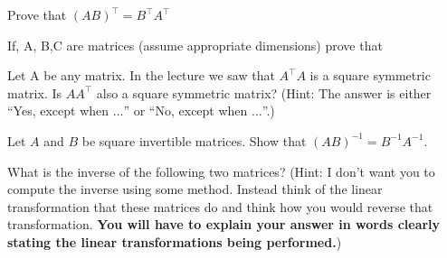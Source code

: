 \documentclass[solution,addpoints,12pt]{exam}
\begin{document}
\begin{questions}
\question[1] Prove that $(AB)^\top = B^\top A^\top$
\begin{solution}
\end{solution}

\question If, A, B,C are matrices (assume appropriate dimensions) prove that 

\question[1] Let A be any matrix. In the lecture we saw that $A^\top A$ is a square symmetric matrix. Is  $AA^\top$ also a square symmetric matrix? (Hint: The answer is either ``Yes, except when $\dots$'' or  ``No, except when $\dots$''.)

\question[1] Let $A$ and $B$ be square invertible matrices. Show that $(AB)^{-1} = B^{-1}A^{-1}$.
\begin{solution}
\end{solution}

\question What is the inverse of the following two matrices? (Hint: I don't want you to compute the inverse using some method. Instead think of the linear transformation that these matrices do and think how you would reverse that transformation. \textbf{You will have to explain your answer in words clearly stating the linear transformations being performed.}) \\
\end{questions}
\end{document}
